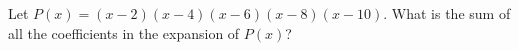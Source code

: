 Let $P(x)=(x-2)(x-4)(x-6)(x-8)(x-10)$. What is the sum of all the coefficients in the expansion of $P(x)$?
